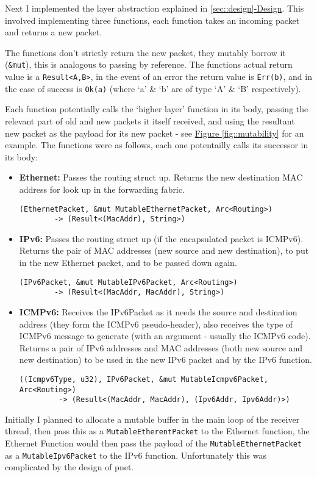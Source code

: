 \documentclass[12pt,a4paper,twoside,openany]{report}
\begin{document}
\bigskip

Next I implemented the layer abstraction explained in \ref{sec::design}\hyperref[sec::design]{-Design}.  This involved implementing three functions, each function takes an incoming packet and returns a new packet.  

The functions don't strictly return the new packet, they mutably borrow it (\verb!&mut!), this is analogous to passing by reference. The functions actual return value is a \verb!Result<A,B>!, in the event of an error the return value is \verb!Err(b)!, and in the case of success is \verb!Ok(a)! (where `a' \& `b' are of type `A' \& `B' respectively). 

Each function potentially calls the `higher layer' function in its body, passing the relevant part of old and new packets it itself received, and using the resultant new packet as the payload for its new packet - see \hyperref[fig::mutability]{Figure }\ref{fig::mutability} for an example. The functions were as follows, each one potentailly calls its successor in its body:
\begin{itemize}
\item \textbf{Ethernet:} Passes the routing struct up. Returns the new destination MAC address for look up in the forwarding fabric.
\begin{verbatim}(EthernetPacket, &mut MutableEthernetPacket, Arc<Routing>)
        -> (Result<(MacAddr), String>)
\end{verbatim}
\item \textbf{IPv6:} Passes the routing struct up (if the encapsulated packet is ICMPv6). Returns the pair of MAC addresses (new source and new destination), to put in the new Ethernet packet, and to be passed down again.
\begin{verbatim}(IPv6Packet, &mut MutableIPv6Packet, Arc<Routing>)
        -> (Result<(MacAddr, MacAddr), String>)
\end{verbatim}
\item \textbf{ICMPv6:} Receives the IPv6Packet as it needs the source and destination address (they form the ICMPv6 pseudo-header), also receives the type of ICMPv6 message to generate (with an argument - usually the ICMPv6 code). Returns a pair of  IPv6 addresses and MAC addresses (both new source and new destination) to be used in the new IPv6 packet and by the IPv6 function.
\begin{verbatim}((Icmpv6Type, u32), IPv6Packet, &mut MutableIcmpv6Packet, Arc<Routing>) 
         -> (Result<(MacAddr, MacAddr), (Ipv6Addr, Ipv6Addr)>)
\end{verbatim}
\end{itemize}
Initially I planned to allocate a mutable buffer in the main loop of the receiver thread, then pass this as a \verb!MutableEtherentPacket! to the Ethernet function, the Ethernet Function would then pass the payload of the \verb!MutableEthernetPacket! as a \verb!MutableIpv6Packet! to the IPv6 function. Unfortunately this was complicated by the design of pnet.  
\end{document}
